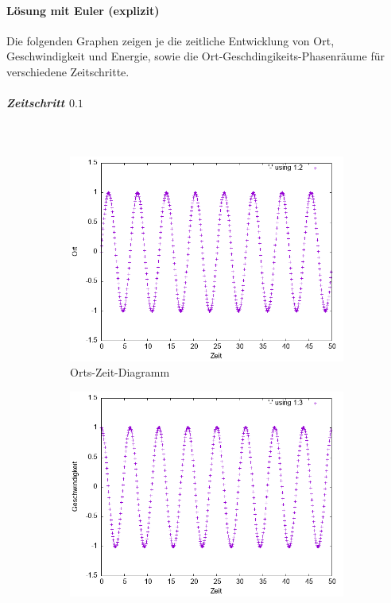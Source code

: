 \documentclass[
    oneside,
    ngerman,
    footinclude=false,
    captions=tableheading,
    DIV=12
]{scrartcl}
\begin{document}
    \aufgabe{}
        \subaufgabe{}
            \paragraph*{Lösung mit Euler (explizit)}
                Die folgenden Graphen zeigen je die zeitliche Entwicklung von Ort, Geschwindigkeit und Energie, sowie die Ort-Geschdingikeits-Phasenräume für verschiedene Zeitschritte.     

                \subparagraph*{Zeitschritt $0.1$}\,
                \begin{figure}[H]
                    \centering
                    \begin{subfigure}[b]{0.45\textwidth}
                        \centering
                        \includegraphics[width=\textwidth]{Bilddateien/expEulerA1(a)-01-0-x.png}
                        \caption{Orts-Zeit-Diagramm}
                        \label{fig:expEulerA1(a)-01-0-x}
                    \end{subfigure}
                    \hfill
                    \begin{subfigure}[b]{0.45\textwidth}
                        \centering
                        \includegraphics[width=\textwidth]{Bilddateien/expEulerA1(a)-01-0-v.png}

\end{subfigure}
\end{figure}
\end{document}
